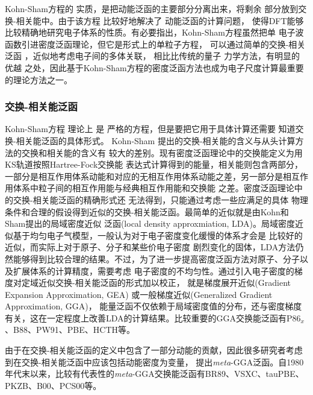 Kohn-Sham方程的%
实质，是把动能泛函的主要部分分离出来，将剩余%
部分放到交换-相关能中。由于该方程%
{比较好地}解决了%
动能泛函的{计算}问题，%
使得DFT能够比较精确地研究电子体系的性质。有必要指出，Kohn-Sham方程虽然把单%
{电}子波函数引进密度泛函理论，但它是{形式上}的单粒子方程，%
可以通过简单的交换-相关泛函%
{，近似地考虑}电子间的多体关联，%
{相比}比传统的量子%
{力}学方法，有明显的%
优越%
{之处}，{因此}基于Kohn-Sham方程的密度泛函方法也成为电子尺度计算最重要的{理论}方法之一。

\subsubsection{交换-相关能泛函}
Kohn-Sham方程%
理论上%
是%
严格的方程，但是要把它用于具体计算还需要%
{知道}交换-相关能泛函的具体形式。%
Kohn-Sham%
提出的交换-相关能的含义与从头计算方法的交换和相关能的含义有%
{较}大的差别{。现有}密度泛函理论中的交换能定义为用KS轨道按照Hartree-Fock交换能%
{表达}式计算得到的能量，相关能则包含两部分，一部分是相互作用体系动能和对应的无相互作用体系动能{之}差，另一部分是相互作用体系中粒子间的相互作用能与经典相互作用{能}和交换能%
{之}差。密度泛函{理论}中的交换-相关能泛函的精确形式还%
{无法}得到，只能通过{考虑}一些{应满足的}具体%
物理%
{条件}和合理的假设得到近似的交换-相关能泛函。最简单的近似就是由Kohn和Sham提出的局域密度近似%
{泛函}(local density approxmiation, LDA){。}局域密度近似基于均匀电子气模型，一般认为对于电子密度变化缓慢的体系{才会}是%
比较好的近似，而实际上对于原子、分子和某些价电子密度%
剧烈变化的固体，LDA方法仍然能够得到比较合理的结果。不过，为了进一步提高密度泛函方法对原子、分子以及扩展体系的计算精度，需要考虑%
电子密度的不均匀性。通过引入电子密度的梯度对{定域近似}交换-相关能{泛函}的形式加以校正，%
{就是}梯度展开近似(Gradient Expansion Approximation, GEA)%
{或}一般梯度近似(Generalized Gradient Approximation, GGA)，%
能量泛函不仅依赖于局域密度值的分布，还与密度梯度有关，这在一定程度上改善LDA的计算结果。比较重要的GGA交换能泛函有P86$_x$、B88、PW91、PBE、HCTH等。

由于在交换-相关能泛函的定义中包含了一部分动能的贡献，因此很多研究者考虑{到}在交换-相关{能}泛函中应该包括动能密度为变量，%
{提出}\textit{meta}-GGA泛函。自1980年代末以来，比较有代表性的\textit{meta}-GGA交换能泛函有BR89、\linebreak VSXC、tauPBE、PKZB、B00、PCS00等。

